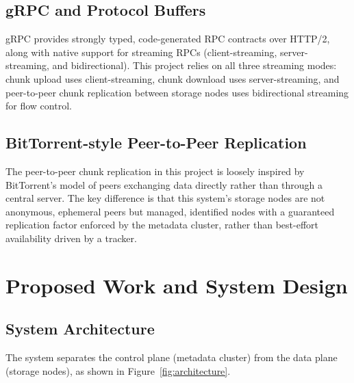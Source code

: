 \documentclass[12pt,a4paper]{report}
\begin{document}
\section{gRPC and Protocol Buffers}
gRPC provides strongly typed, code-generated RPC contracts over HTTP/2, along with native support for streaming RPCs (client-streaming, server-streaming, and bidirectional). This project relies on all three streaming modes: chunk upload uses client-streaming, chunk download uses server-streaming, and peer-to-peer chunk replication between storage nodes uses bidirectional streaming for flow control.

\section{BitTorrent-style Peer-to-Peer Replication}
The peer-to-peer chunk replication in this project is loosely inspired by BitTorrent's model of peers exchanging data directly rather than through a central server. The key difference is that this system's storage nodes are not anonymous, ephemeral peers but managed, identified nodes with a guaranteed replication factor enforced by the metadata cluster, rather than best-effort availability driven by a tracker.

\chapter{Proposed Work and System Design}

\section{System Architecture}

The system separates the control plane (metadata cluster) from the data plane (storage nodes), as shown in Figure~\ref{fig:architecture}.
\end{document}
